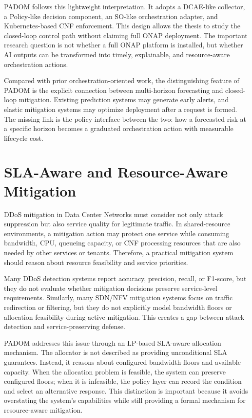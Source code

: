 \documentclass[12pt, a4paper, reqno, oneside]{book}
\newcommand{\padonap}{\textsc{PADOM}}
\begin{document}
\padonap{} follows this lightweight interpretation. It adopts a DCAE-like
collector, a Policy-like decision component, an SO-like orchestration adapter,
and Kubernetes-based CNF enforcement. This design allows the thesis to study
the closed-loop control path without claiming full ONAP deployment. The
important research question is not whether a full ONAP platform is installed,
but whether AI outputs can be transformed into timely, explainable, and
resource-aware orchestration actions.

Compared with prior orchestration-oriented work, the distinguishing feature of
\padonap{} is the explicit connection between multi-horizon forecasting and
closed-loop mitigation. Existing prediction systems may generate early alerts,
and elastic mitigation systems may optimize deployment after a request is
formed. The missing link is the policy interface between the two: how a
forecasted risk at a specific horizon becomes a graduated orchestration action
with measurable lifecycle cost.

\section{SLA-Aware and Resource-Aware Mitigation}
\label{sec:related-sla}

DDoS mitigation in Data Center Networks must consider not only attack
suppression but also service quality for legitimate traffic. In shared-resource
environments, a mitigation action may protect one service while consuming
bandwidth, CPU, queueing capacity, or CNF processing resources that are also
needed by other services or tenants. Therefore, a practical mitigation system
should reason about resource feasibility and service priorities.

Many DDoS detection systems report accuracy, precision, recall, or F1-score,
but they do not evaluate whether mitigation decisions preserve service-level
requirements. Similarly, many SDN/NFV mitigation systems focus on traffic
redirection or filtering, but they do not explicitly model bandwidth floors or
allocation feasibility during active mitigation. This creates a gap between
attack detection and service-preserving defense.

\padonap{} addresses this issue through an LP-based SLA-aware allocation
mechanism. The allocator is not described as providing unconditional SLA
guarantees. Instead, it reasons about configured bandwidth floors and available
capacity. When the allocation problem is feasible, the system can preserve
configured floors; when it is infeasible, the policy layer can record the
condition and select an alternative response. This distinction is important
because it avoids overstating the system's capabilities while still providing
a formal mechanism for resource-aware mitigation.
\end{document}
